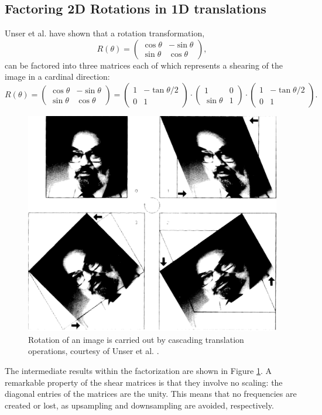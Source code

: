 \documentclass[]{usiinfbachelorproject}
\begin{document}
	\subsection{Factoring 2D Rotations in 1D translations}
	
	Unser et al. \cite{main_article} have shown that a rotation transformation,
	\begin{equation*}
		R(\theta) = 
		\begin{pmatrix}
			\cos\theta & -\sin\theta\\
			\sin\theta & \cos\theta
		\end{pmatrix},
	\end{equation*}
	can be factored into three matrices each of which represents a shearing of the image in a cardinal direction:
	\begin{equation}\label{3_translations}
		R(\theta) = 
		\begin{pmatrix}
			\cos\theta & -\sin\theta\\
			\sin\theta & \cos\theta
		\end{pmatrix}
		=
		\begin{pmatrix}
			1 & -\tan\theta/2\\
			0 & 1
		\end{pmatrix}
		\cdot
		\begin{pmatrix}
			1 & 0\\
			\sin\theta & 1
		\end{pmatrix}
		\cdot
		\begin{pmatrix}
			1 & -\tan\theta/2\\
			0 & 1
		\end{pmatrix}.
	\end{equation} 
	\begin{figure}
		\centering
		\includegraphics[width=0.5\columnwidth]{images/unser_rotation.png}
		\caption{Rotation of an image is carried out by cascading translation operations, courtesy of Unser et al. \cite{main_article}.}
		\label{fig:chinese_rotation}
	\end{figure}
	The intermediate results within the factorization are shown in Figure \ref{fig:chinese_rotation}.
	A remarkable property of the shear matrices is that they involve no scaling: the diagonal entries of the matrices are the unity. This means that no frequencies are created or lost, as upsampling and downsampling are avoided, respectively.
	
\end{document}
